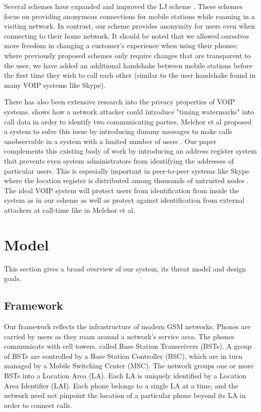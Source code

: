 \documentclass[11pt]{article}
\begin{document}
Several schemes have expanded and improved the LJ scheme \cite{hwang2006wireless, peinado2004privacy, yang2005secure}. These schemes focus on providing anonymous connections for mobile stations while roaming in a visiting network. In contrast, our scheme provides anonymity for users even when connecting to their home network. It should be noted that we allowed ourselves more freedom in changing a customer's experience when using their phones; where previously proposed schemes only require changes that are transparent to the user, we have added an additional handshake between mobile stations before the first time they wish to call each other (similar to the user handshake found in many VOIP systems like Skype).

There has also been extensive research into the privacy properties of VOIP systems. \cite{wang2005tracking, benini2008assessing} shows how a network attacker could introduce "timing watermarks" into call data in order to identify two communicating parties. Melchor et al proposed a system to solve this issue by introducing dummy messages to make calls unobservable in a system with a limited number of users \cite{melchor2007closed}.  Our paper complements this existing body of work by introducing an address register system that prevents even system administrators from identifying the addresses of particular users. This is especially important in peer-to-peer systems like Skype where the location register is distributed among thousands of untrusted nodes \cite{garfinkel2005voip, perenyi2007skype}. The ideal VOIP system will protect users from identification from inside the system as in our scheme as well as protect against identification from external attackers at call-time like in Melchor et al.

\section{Model}
This section gives a broad overview of our system, its threat model and design goals. 

\subsection{Framework}
Our framework reflects the infrastructure of modern GSM networks. Phones are carried by users as they roam around a network's service area. The phones communicate with cell towers, called Base Station Transceivers (BSTs). A group of BSTs are controlled by a Base Station Controller (BSC), which are in turn managed by a Mobile Switching Center (MSC). The network groups one or more BSTs into a Location Area (LA). Each LA is uniquely identified by a Location Area Identifier (LAI). Each phone belongs to a single LA at a time, and the network need not pinpoint the location of a particular phone beyond its LA in order to connect calls. 
\end{document}
